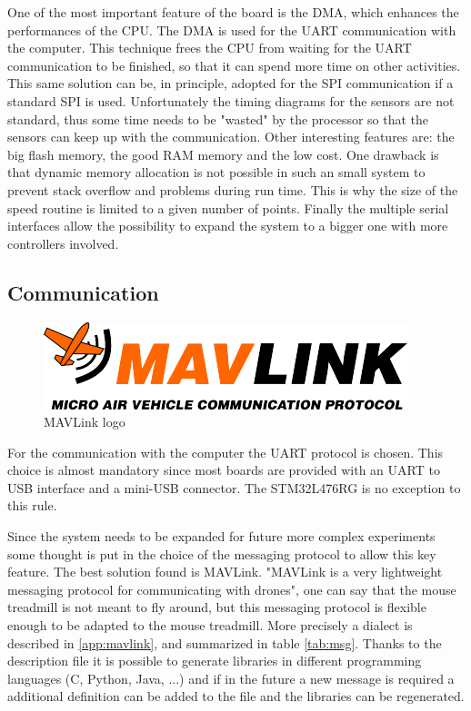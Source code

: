 \documentclass[12pt,a4paper]{article}
\begin{document}
One of the most important feature of the board is the DMA, which enhances the performances of the CPU. The DMA is used for the UART communication with the computer. This technique frees the CPU from waiting for the UART communication to be finished, so that it can spend more time on other activities. This same solution can be, in principle, adopted for the SPI communication if a standard SPI is used. Unfortunately the timing diagrams for the sensors are not standard, thus some time needs to be "wasted" by the processor so that the sensors can keep up with the communication.
Other interesting features are: the big flash memory, the good RAM memory and the low cost. One drawback is that dynamic memory allocation is not possible in such an small system to prevent stack overflow and problems during run time. This is why the size of the speed routine is limited to a given number of points.
Finally the multiple serial interfaces allow the possibility to expand the system to a bigger one with more controllers involved.

\subsection{Communication}

\begin{figure}
	\includegraphics[width=\linewidth]{fig/MAVLink_logo.png}
	\caption{MAVLink logo}\label{fig:MAVLink_logo}
\end{figure}
For the communication with the computer the UART protocol is chosen. This choice is almost mandatory since most boards are provided with an UART to USB interface and a mini-USB connector. The STM32L476RG is no exception to this rule.

Since the system needs to be expanded for future more complex experiments some thought is put in the choice of the messaging protocol to allow this key feature.
The best solution found is MAVLink. "MAVLink is a very lightweight messaging protocol for communicating with drones"\cite{mavlink}, one can say that the mouse treadmill is not meant to fly around, but this messaging protocol is flexible enough to be adapted to the mouse treadmill.
More precisely a dialect is described in \ref{app:mavlink}, and summarized in table \ref{tab:msg}. Thanks to the description file it is possible to generate libraries in different programming languages (C, Python, Java, ...) and if in the future a new message is required a additional definition can be added to the file and the libraries can be regenerated.
\end{document}
